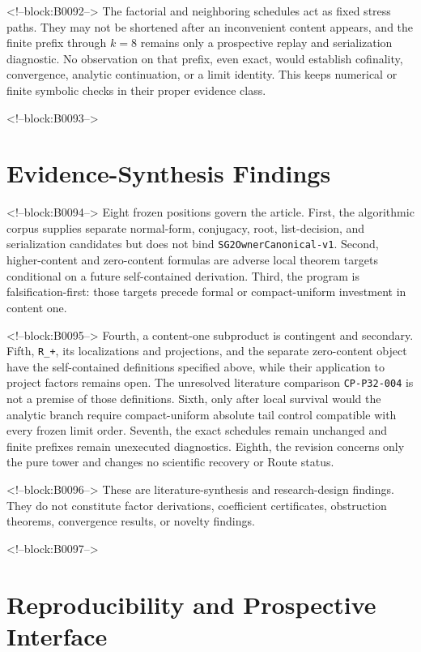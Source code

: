 \documentclass[11pt]{article}
\begin{document}
<!--block:B0092-->
The factorial and neighboring schedules act as fixed stress paths. They
may not be shortened after an inconvenient content appears, and the
finite prefix through $k=8$ remains only a prospective replay and
serialization diagnostic. No observation on that prefix, even exact,
would establish cofinality, convergence, analytic continuation, or a
limit identity. This keeps numerical or finite symbolic checks in their
proper evidence class.

<!--block:B0093-->
\hypertarget{5-evidence-synthesis-findings}{%
\section{Evidence-Synthesis
Findings}\label{5-evidence-synthesis-findings}}

<!--block:B0094-->
Eight frozen positions govern the article. First, the algorithmic corpus
supplies separate normal-form, conjugacy, root, list-decision, and
serialization candidates but does not bind
\texttt{SG2OwnerCanonical-v1}. Second, higher-content and zero-content
formulas are adverse local theorem targets conditional on a future
self-contained derivation. Third, the program is falsification-first:
those targets precede formal or compact-uniform investment in content
one.

<!--block:B0095-->
Fourth, a content-one subproduct is contingent and secondary. Fifth,
\texttt{R\_+}, its localizations and projections, and the separate
zero-content object have the self-contained definitions specified above,
while their application to project factors remains open.
The unresolved literature comparison \texttt{CP-P32-004} is not a premise
of those definitions. Sixth, only after local survival
would the analytic branch require compact-uniform absolute tail control
compatible with every frozen limit order. Seventh, the exact schedules
remain unchanged and finite prefixes remain unexecuted diagnostics.
Eighth, the revision concerns only the pure tower and changes no
scientific recovery or Route status.

<!--block:B0096-->
These are literature-synthesis and research-design findings. They do not
constitute factor derivations, coefficient certificates, obstruction
theorems, convergence results, or novelty findings.

<!--block:B0097-->
\hypertarget{6-reproducibility-and-prospective-interface}{%
\section{Reproducibility and Prospective
Interface}\label{6-reproducibility-and-prospective-interface}}
\end{document}
